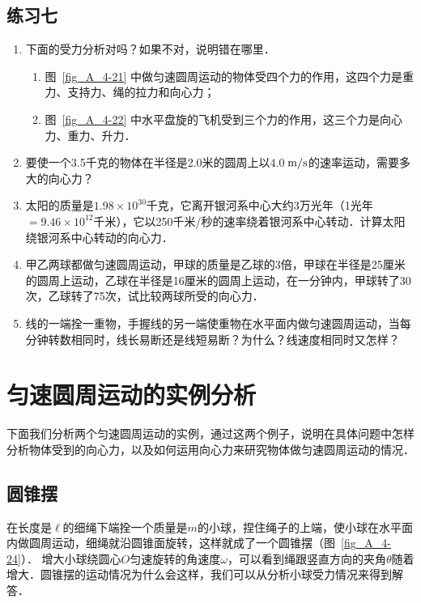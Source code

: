 \subsection*{练习七}
\begin{enumerate}
    \item 下面的受力分析对吗？如果不对，说明错在哪里．
    \begin{enumerate}
        \item 图~\ref{fig_A_4-21} 中做匀速圆周运动的物体受四个力的作用，这四个力是重力、支持力、绳的拉力和向心力；
        \item 图~\ref{fig_A_4-22} 中水平盘旋的飞机受到三个力的作用，这三个力是向心力、重力、升力．
    \end{enumerate}
\item 要使一个3.5千克的物体在半径是2.0米的圆周上以4.0$\;\text{m}/\text{s}$的速率运动，需要多大的向心力？
\item 太阳的质量是$1.98\times 10^{30}$千克，它离开银河系中心大约3万光年（1光年$=9.46\times 10^{12}$千米），它以250千米/秒的速率绕着银河系中心转动．计算太阳绕银河系中心转动的向心力．
\item 甲乙两球都做匀速圆周运动，甲球的质量是乙球的3倍，甲球在半径是25厘米的圆周上运动，乙球在半径是16厘米的圆周上运动，在一分钟内，甲球转了30次，乙球转了75次，试比较两球所受的向心力．
\item 线的一端拴一重物，手握线的另一端使重物在水平面内做匀速圆周运动，当每分钟转数相同时，线长易断还是线短易断？为什么？线速度相同时又怎样？
\end{enumerate}


\section{匀速圆周运动的实例分析}
下面我们分析两个匀速圆周运动的实例，通过这两个例子，说明在具体问题中怎样分析物体受到的向心力，以及如何运用向心力来研究物体做匀速圆周运动的情况．

\subsection{圆锥摆}

在长度是$\ell$的细绳下端拴一个质量是$m$的小球，捏住绳子的上端，使小球在水平面内做圆周运动，细绳就沿圆锥面旋转，这样就成了一个圆锥摆（图~\ref{fig_A_4-24}）．
增大小球绕圆心$O$匀速旋转的角速度$\omega$，可以看到绳跟竖直方向的夹角$\theta$随着增大．圆锥摆的运动情况为什么会这样，我们可以从分析小球受力情况来得到解答．

